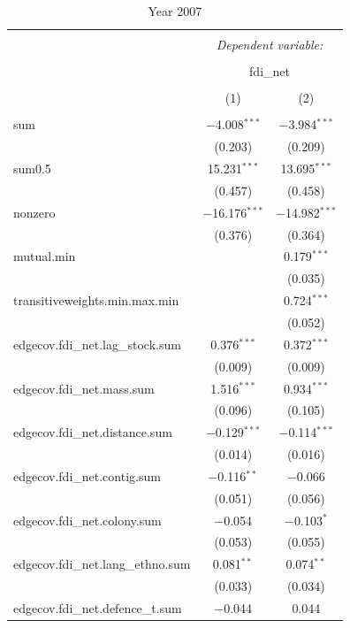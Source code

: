 \documentclass{article}
\begin{document}
\newpage
\begin{table}[!htbp] \centering 
  \caption{Year 2007} 
  \label{} 
\small 
\begin{tabular}{@{\extracolsep{2pt}}lcc} 
\\[-1.8ex]\hline 
\hline \\[-1.8ex] 
 & \multicolumn{2}{c}{\textit{Dependent variable:}} \\ 
\cline{2-3} 
\\[-1.8ex] & \multicolumn{2}{c}{fdi\_net} \\ 
\\[-1.8ex] & (1) & (2)\\ 
\hline \\[-1.8ex] 
 sum & $-$4.008$^{***}$ & $-$3.984$^{***}$ \\ 
  & (0.203) & (0.209) \\ 
  sum0.5 & 15.231$^{***}$ & 13.695$^{***}$ \\ 
  & (0.457) & (0.458) \\ 
  nonzero & $-$16.176$^{***}$ & $-$14.982$^{***}$ \\ 
  & (0.376) & (0.364) \\ 
  mutual.min &  & 0.179$^{***}$ \\ 
  &  & (0.035) \\ 
  transitiveweights.min.max.min &  & 0.724$^{***}$ \\ 
  &  & (0.052) \\ 
  edgecov.fdi\_net.lag\_stock.sum & 0.376$^{***}$ & 0.372$^{***}$ \\ 
  & (0.009) & (0.009) \\ 
  edgecov.fdi\_net.mass.sum & 1.516$^{***}$ & 0.934$^{***}$ \\ 
  & (0.096) & (0.105) \\ 
  edgecov.fdi\_net.distance.sum & $-$0.129$^{***}$ & $-$0.114$^{***}$ \\ 
  & (0.014) & (0.016) \\ 
  edgecov.fdi\_net.contig.sum & $-$0.116$^{**}$ & $-$0.066 \\ 
  & (0.051) & (0.056) \\ 
  edgecov.fdi\_net.colony.sum & $-$0.054 & $-$0.103$^{*}$ \\ 
  & (0.053) & (0.055) \\ 
  edgecov.fdi\_net.lang\_ethno.sum & 0.081$^{**}$ & 0.074$^{**}$ \\ 
  & (0.033) & (0.034) \\ 
  edgecov.fdi\_net.defence\_t.sum & $-$0.044 & 0.044 \\ 

\end{tabular}
\end{table}
\end{document}
